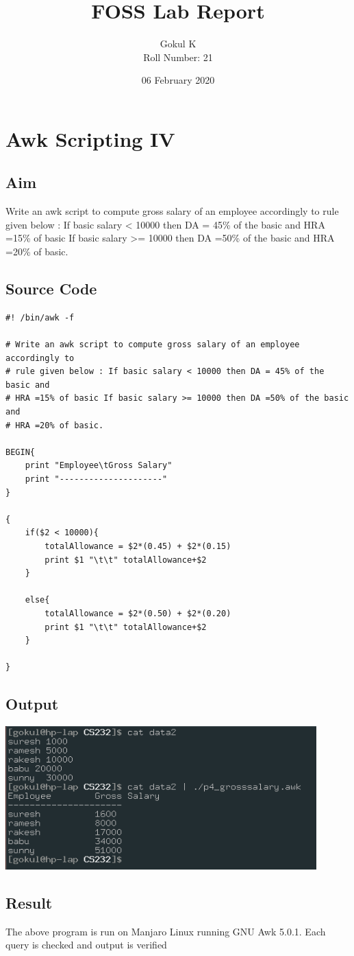 \documentclass{article}
\begin{document}
\title{FOSS Lab Report}
\author{Gokul K\\[2\baselineskip]
Roll Number: 21\\[2\baselineskip]}
\date{06 February 2020}

\maketitle

\setcounter{section}{22}
\section{Awk Scripting IV}
\subsection{Aim}
Write an awk script to compute gross salary of an employee accordingly to
rule given below : If basic salary < 10000 then DA = 45\% of the basic and 
HRA =15\% of basic If basic salary >= 10000 then DA =50\% of the basic and 
HRA =20\% of basic.


\subsection{Source Code}
\begin{verbatim}
#! /bin/awk -f

# Write an awk script to compute gross salary of an employee accordingly to
# rule given below : If basic salary < 10000 then DA = 45% of the basic and 
# HRA =15% of basic If basic salary >= 10000 then DA =50% of the basic and 
# HRA =20% of basic.

BEGIN{
    print "Employee\tGross Salary"
    print "---------------------"
}

{
    if($2 < 10000){
        totalAllowance = $2*(0.45) + $2*(0.15)
        print $1 "\t\t" totalAllowance+$2
    }

    else{
        totalAllowance = $2*(0.50) + $2*(0.20)
        print $1 "\t\t" totalAllowance+$2
    }    

}
\end{verbatim}

\subsection{Output}
\includegraphics[width=0.9\textwidth]{img/p23.png}\newline

\subsection{Result}
The above program is run on Manjaro Linux running GNU Awk 5.0.1. 
Each query is checked and output is verified
\end{document}
